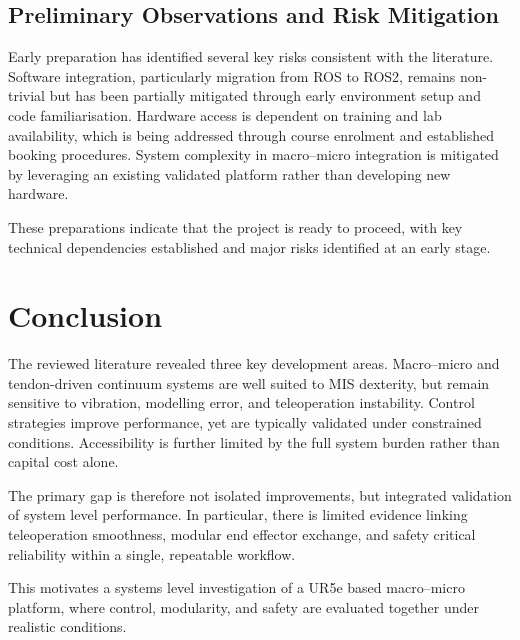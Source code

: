 \documentclass[12pt]{article}
\begin{document}
\subsection{Preliminary Observations and Risk Mitigation}

Early preparation has identified several key risks consistent with the
literature. Software integration, particularly migration from ROS to ROS2,
remains non-trivial but has been partially mitigated through early environment
setup and code familiarisation. Hardware access is dependent on training and lab
availability, which is being addressed through course enrolment and established
booking procedures. System complexity in macro--micro integration is mitigated
by leveraging an existing validated platform rather than developing new
hardware.

These preparations indicate that the project is ready to proceed, with key
technical dependencies established and major risks identified at an early stage.

\section{Conclusion}

The reviewed literature revealed three key development areas. Macro--micro and
tendon-driven continuum systems are well suited to MIS dexterity, but remain
sensitive to vibration, modelling error, and teleoperation instability. Control
strategies improve performance, yet are typically validated under constrained
conditions. Accessibility is further limited by the full system burden rather than
capital cost alone.

The primary gap is therefore not isolated improvements, but integrated
validation of system level performance. In particular, there is limited evidence
linking teleoperation smoothness, modular end effector exchange, and
safety critical reliability within a single, repeatable workflow.

This motivates a systems level investigation of a UR5e based macro--micro
platform, where control, modularity, and safety are evaluated together under
realistic conditions.

\newpage
{} 
\printbibliography

\newpage
\appendix
{}
\end{document}

